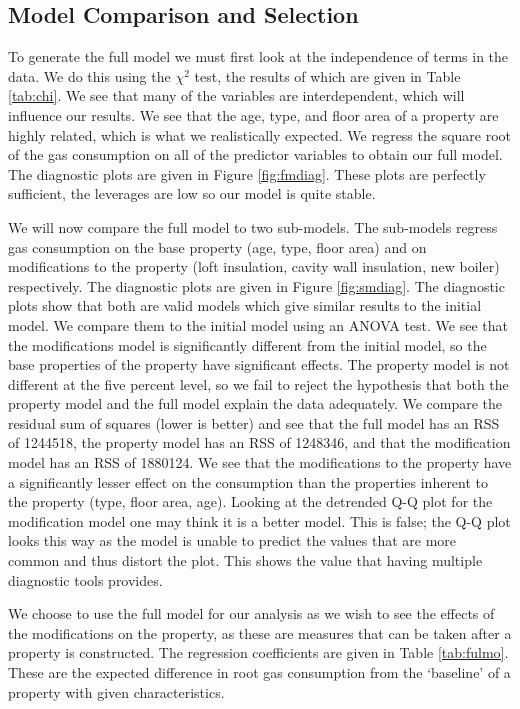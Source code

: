 \documentclass[9pt]{extarticle}
\begin{document}
\subsection{Model Comparison and Selection}
To generate the full model we must first look at the independence of terms in the data. We do this using the $\chi^2$ test, the results of which are given in Table \ref{tab:chi}. We see that many of the variables are interdependent, which will influence our results. We see that the age, type, and floor area of a property are highly related, which is what we realistically expected. We regress the square root of the gas consumption on all of the predictor variables to obtain our full model. The diagnostic plots are given in Figure \ref{fig:fmdiag}. These plots are perfectly sufficient, the leverages are low so our model is quite stable. 

We will now compare the full model to two sub-models. The sub-models regress gas consumption on the base property (age, type, floor area) and on modifications to the property (loft insulation, cavity wall insulation, new boiler) respectively. The diagnostic plots are given in Figure \ref{fig:smdiag}. The diagnostic plots show that both are valid models which give similar results to the initial model. We compare them to the initial model using an ANOVA test. We see that the modifications model is significantly different from the initial model, so the base properties of the property have significant effects. The property model is not different at the five percent level, so we fail to reject the hypothesis that both the property model and the full model explain the data adequately. We compare the residual sum of squares (lower is better) and see that the full model has an RSS of 1244518, the property model has an RSS of 1248346, and that the modification model has an RSS of 1880124. We see that the modifications to the property have a significantly lesser effect on the consumption than the properties inherent to the property (type, floor area, age). Looking at the detrended Q-Q plot for the modification model one may think it is a better model. This is false; the Q-Q plot looks this way as the model is unable to predict the values that are more common and thus distort the plot. This shows the value that having multiple diagnostic tools provides.

We choose to use the full model for our analysis as we wish to see the effects of the modifications on the property, as these are measures that can be taken after a property is constructed. The regression coefficients are given in Table \ref{tab:fulmo}. These are the expected difference in root gas consumption from the `baseline' of a property with given characteristics.
\end{document}
